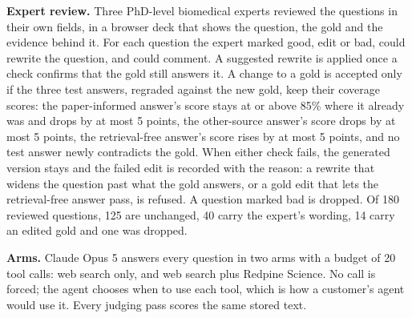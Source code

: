 \documentclass[sn-mathphys,Numbered]{sn-jnl}%
\newcommand{\lead}[1]{\textbf{#1}}   %
\begin{document}
\lead{Expert review.} Three PhD-level biomedical experts reviewed the questions in their
own fields, in a browser deck that shows the question, the gold and the evidence behind
it. For each question the expert marked good, edit or bad, could rewrite the question,
and could comment. A suggested rewrite is applied once a check confirms that the gold still
answers it. A change to a gold is accepted only if the three test answers, regraded
against the new gold, keep their coverage scores: the paper-informed answer's score stays
at or above 85\% where it already was and drops by at most 5 points, the other-source answer's score drops by
at most 5 points, the retrieval-free answer's score rises by at most 5 points, and no
test answer
newly contradicts the gold. When either check fails, the
generated version stays and the failed edit is recorded with the reason: a rewrite that
widens the question past what the gold answers, or a gold edit that lets the
retrieval-free answer pass, is refused. A question marked bad is dropped. Of 180 reviewed questions, 125 are unchanged, 40 carry the expert's
wording, 14 carry an edited gold and one was dropped.

\lead{Arms.} Claude Opus 5 answers every question in two arms with a budget of 20
tool calls: web search only, and web search plus Redpine Science. No call is forced;
the agent chooses when to use each tool, which is how a customer's agent would use it.
Every judging pass scores the same stored text.
\end{document}
